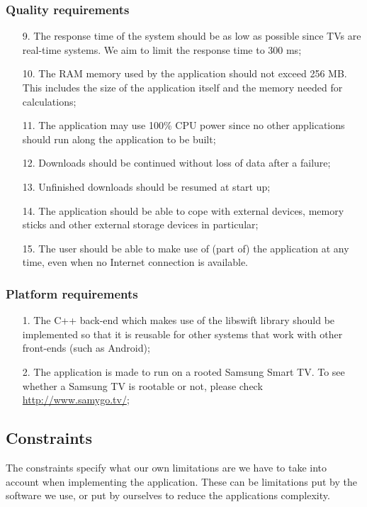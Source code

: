 \subsubsection{Quality requirements}
\begin{itemize}
\item[9.] The response time of the system should be as low as possible since TVs are real-time systems.
We aim to limit the response time to 300 ms;
\item[10.] The RAM memory used by the application should not exceed 256 MB.
This includes the size of the application itself and the memory needed for calculations;
\item[11.] The application may use 100\% CPU power since no other applications should run along the application 
to be built;
\item[12.] Downloads should be continued without loss of data after a failure;
\item[13.] Unfinished downloads should be resumed at start up;
\item[14.] The application should be able to cope with external devices,
memory sticks and other external storage devices in particular;
\item[15.] The user should be able to make use of (part of) the application at any time,
even when no Internet connection is available.
\end{itemize}

\subsubsection{Platform requirements}
\begin{itemize}
\item[1.] The C++ back-end which makes use of the libswift library should be implemented so 
that it is reusable for other systems that work with other front-ends (such as Android);
\item[2.] The application is made to run on a rooted Samsung Smart TV.
To see whether a Samsung TV is rootable or not, please check \url{http://www.samygo.tv/};
\end{itemize}

\subsection{Constraints}
The constraints specify what our own limitations are we have to take into account when implementing the application. 
These can be limitations put by the software we use,
or put by ourselves to reduce the application\textquotesingle s complexity.

